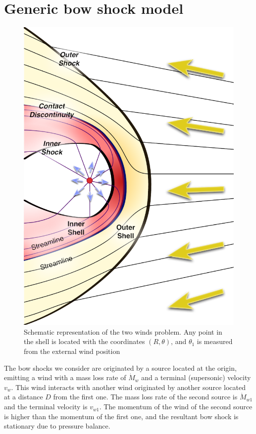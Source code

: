\section{Generic bow shock model}
\label{sec:generic-model}

\begin{figure}
\includegraphics[width=\linewidth]{figs/generic-bowshock}
\caption{Schematic representation of the two winds problem. Any point in the shell is located with the coordinates
$(R,\theta)$, and $\theta_1$ is measured from the external wind position}
\label{fig:2-winds}
\end{figure}

The bow shocks we consider are originated by a source located at the origin, emitting a wind with a mass loss rate of $\dot{M}_w$ and a terminal
(supersonic) velocity $v_w$. This wind interacts with another wind originated by another source located at a distance $D$ from the first one. 
The mass loss rate of the second source is $\dot{M}_{w1}$ and the terminal velocity is $v_{w1}$. The momentum of the wind of the second source is
higher than the momentum of the first one, and the resultant bow shock is stationary due to pressure balance. 

